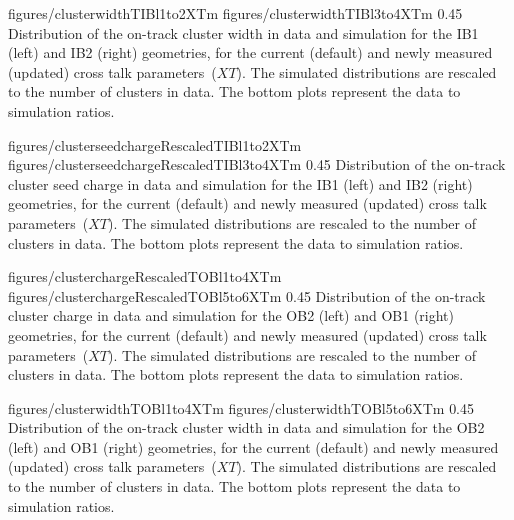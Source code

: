                  {figures/clusterwidthTIBl1to2XTm}
                 {figures/clusterwidthTIBl3to4XTm}
                 {0.45}       %
                 { Distribution of the on-track cluster width in data and simulation for the IB1 (left) and IB2 (right) geometries, for the current (default) and newly measured (updated) cross talk parameters~($XT$).  The simulated distributions are rescaled to the number of clusters in data.  The bottom plots represent the data to simulation ratios. }

                 {figures/clusterseedchargeRescaledTIBl1to2XTm} %
                 {figures/clusterseedchargeRescaledTIBl3to4XTm} %
                 {0.45}       %
                 { Distribution of the on-track cluster seed charge in data and simulation for the IB1 (left) and IB2 (right) geometries, for the current (default) and newly measured (updated) cross talk parameters~($XT$).  The simulated distributions are rescaled to the number of clusters in data.  The bottom plots represent the data to simulation ratios. }


                 {figures/clusterchargeRescaledTOBl1to4XTm} %
                 {figures/clusterchargeRescaledTOBl5to6XTm} %
                 {0.45}       %
                 { Distribution of the on-track cluster charge in data and simulation for the OB2 (left) and OB1 (right) geometries, for the current (default) and newly measured (updated) cross talk parameters~($XT$).  The simulated distributions are rescaled to the number of clusters in data.  The bottom plots represent the data to simulation ratios. }

                 {figures/clusterwidthTOBl1to4XTm}
                 {figures/clusterwidthTOBl5to6XTm}
                 {0.45}       %
                 { Distribution of the on-track cluster width in data and simulation for the OB2 (left) and OB1 (right) geometries, for the current (default) and newly measured (updated) cross talk parameters~($XT$).  The simulated distributions are rescaled to the number of clusters in data.  The bottom plots represent the data to simulation ratios. }

